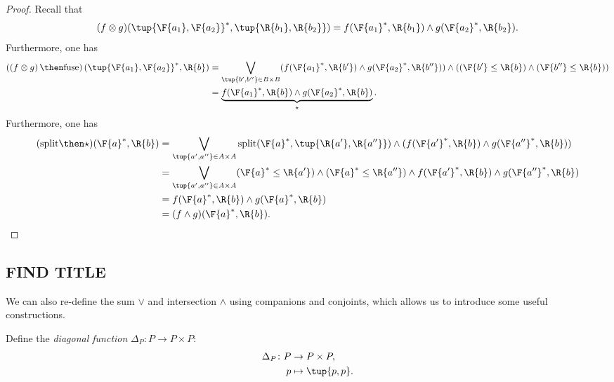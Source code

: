 \begin{proof}
    Recall that 
    \begin{equation}
        (f\otimes g)(\tup{\F{a_1},\F{a_2}}^*,\tup{\R{b_1},\R{b_2}})=f(\F{a_1}^*,\R{b_1})\wedge g(\F{a_2}^*,\R{b_2}).
    \end{equation}
    Furthermore, one has
    \begin{equation}
        \begin{aligned}
            \left(\left(f\otimes g\right) \then \text{fuse}\right)(\tup{\F{a_1},\F{a_2}}^*,\R{b})&=\bigvee_{\tup{b',b''}\in B\times B}(f(\F{a_1}^*,\R{b'})\wedge g(\F{a_2}^*,\R{b''}))\wedge ((\F{b'}\leq \R{b}) \wedge (\F{b''}\leq \R{b}))\\
            &=\underbrace{f(\F{a_1}^*,\R{b})\wedge g(\F{a_2}^*,\R{b})}_{\star}.
        \end{aligned}
    \end{equation}
    Furthermore, one has
    \begin{equation}
        \begin{aligned}
        (\text{split}\then \star)(\F{a}^*,\R{b})&=\bigvee_{\tup{a',a''}\in A\times A} \text{split}(\F{a}^*,\tup{\R{a'},\R{a''}})\wedge (f(\F{a'}^*,\R{b})\wedge g(\F{a''}^*,\R{b}))\\
        &=\bigvee_{\tup{a',a''}\in A\times A}(\F{a}^*\leq \R{a'})\wedge (\F{a}^*\leq \R{a''})\wedge f(\F{a'}^*,\R{b})\wedge g(\F{a''}^*,\R{b})\\
        &=f(\F{a}^*,\R{b})\wedge g(\F{a}^*,\R{b})\\
        &=(f\wedge g)(\F{a}^*,\R{b}).
        \end{aligned}
    \end{equation}
\end{proof}

\subsection{FIND TITLE}

We can also re-define the sum $\vee$ and intersection $\wedge$ using companions and conjoints, which allows us to introduce some useful constructions.

\begin{definition}
Define the \emph{diagonal function} $\Delta_P\colon P \to P \times P$:
\begin{equation}
\begin{aligned}
    \Delta_P \colon P & \to P \times P, \\
             p & \mapsto \tup{p, p}.
\end{aligned}
\end{equation}
\end{definition}

